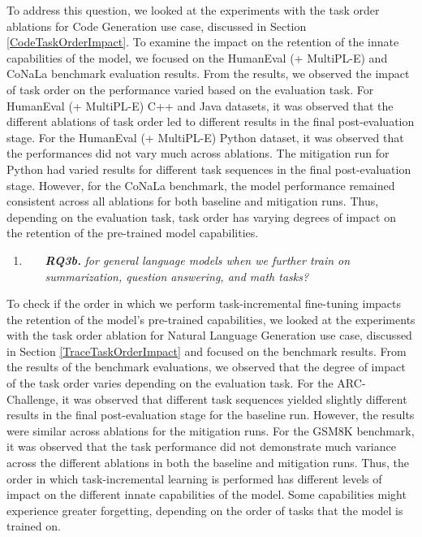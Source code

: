To address this question, we looked at the experiments with the task order ablations for Code Generation use case, discussed in Section \ref{CodeTaskOrderImpact}. To examine the impact on the retention of the innate capabilities of the model, we focused on the HumanEval (+ MultiPL-E) and CoNaLa benchmark evaluation results. From the results, we observed the impact of task order on the performance varied based on the evaluation task. For HumanEval (+ MultiPL-E) C++ and Java datasets, it was observed that the different ablations of task order led to different results in the final post-evaluation stage. For the HumanEval (+ MultiPL-E) Python dataset, it was observed that the performances did not vary much across ablations. The mitigation run for Python had varied results for different task sequences in the final post-evaluation stage. However, for the CoNaLa benchmark, the model performance remained consistent across all ablations for both baseline and mitigation runs. Thus, depending on the evaluation task, task order has varying degrees of impact on the retention of the pre-trained model capabilities.

\newcommand{\RQthreeb}{for general language models when we further train on summarization, question answering, and math tasks?}

\begin{enumerate}
\item  
    \begin{enumerate}
        \item[\textit{\textbf{RQ3b.}}] \textit{\RQthreeb}
    \end{enumerate}
\end{enumerate}

To check if the order in which we perform task-incremental fine-tuning impacts the retention of the model's pre-trained capabilities, we looked at the experiments with the task order ablation for Natural Language Generation use case, discussed in Section \ref{TraceTaskOrderImpact} and focused on the benchmark results. From the results of the benchmark evaluations, we observed that the degree of impact of the task order varies depending on the evaluation task. For the ARC-Challenge, it was observed that different task sequences yielded slightly different results in the final post-evaluation stage for the baseline run. However, the results were similar across ablations for the mitigation runs. For the GSM8K benchmark, it was observed that the task performance did not demonstrate much variance across the different ablations in both the baseline and mitigation runs. Thus, the order in which task-incremental learning is performed has different levels of impact on the different innate capabilities of the model. Some capabilities might experience greater forgetting, depending on the order of tasks that the model is trained on.


